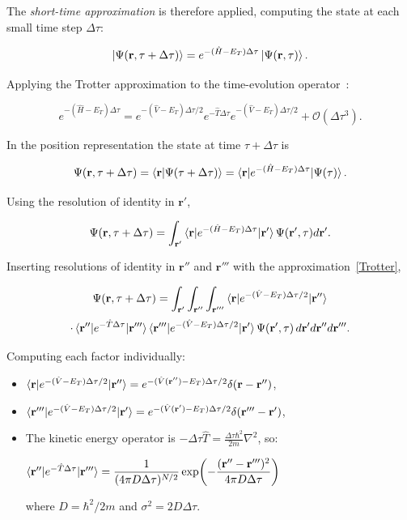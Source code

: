 \documentclass[11pt,a4paper,twoside,pdf]{article}
\numberwithin{equation}{section}
\begin{document}
The \textit{short-time approximation} is therefore applied, computing the state at
each small time step $\Delta \tau$:

$$
    \ket{\Psi(\mathbf{r}, \tau + \Delta \tau)} = e^{-(\hat{H}-E_T)\Delta \tau} \ket{\Psi(\mathbf{r}, \tau)}.
$$

Applying the Trotter approximation to the time-evolution operator~\cite{kalos2008monte}:

\begin{equation}
    e^{-(\hat{H}-E_T)\Delta \tau} = e^{-(\hat{V}-E_T)\Delta \tau/2}e^{-\hat{T}\Delta \tau}e^{-(\hat{V}-E_T)\Delta \tau /2} + \mathcal{O} (\Delta \tau^3).
\label{Trotter}
\end{equation}

In the position representation the state at time $\tau + \Delta \tau$ is

$$
    \Psi(\mathbf{r}, \tau + \Delta \tau) = \braket{\mathbf{r}|\Psi(\tau + \Delta \tau)} =  \braket{\mathbf{r}| e^{-(\hat{H}-E_T)\Delta \tau} | \Psi( \tau)}.
$$

Using the resolution of identity in $\mathbf{r'}$,

$$
    \Psi(\mathbf{r}, \tau + \Delta \tau) =\int_{\mathbf{r'}} \braket{\mathbf{r}| e^{-(\hat{H}-E_T)\Delta \tau} | \mathbf{r'}} \Psi(\mathbf{r'}, \tau ) d\mathbf{r'}.
$$

Inserting resolutions of identity in $\mathbf{r''}$ and $\mathbf{r'''}$
with the approximation~\ref{Trotter},

$$
    \Psi(\mathbf{r}, \tau + \Delta \tau) =
    \int_{\mathbf{r'}} \int_{\mathbf{r''}} \int_{\mathbf{r'''}}
    \braket{\mathbf{r}| e^{-(\hat{V}-E_T)\Delta \tau/2} | \mathbf{r''}}
$$
$$
    \cdot \braket{\mathbf{r''}| e^{-\hat{T}\Delta \tau} | \mathbf{r'''}}
    \braket{\mathbf{r'''}|e^{-(\hat{V}-E_T)\Delta \tau/2} | \mathbf{r'}}
    \Psi(\mathbf{r'}, \tau )
    \,d\mathbf{r'} d\mathbf{r''} d\mathbf{r'''}.
$$

Computing each factor individually:

\begin{itemize}
    \item $\braket{\mathbf{r}| e^{-(\hat{V}-E_T)\Delta \tau/2} | \mathbf{r''}} = e^{-(\hat{V}(\mathbf{r''})-E_T)\Delta\tau/2} \delta(\mathbf{r-r''})$,
    \item $\braket{\mathbf{r'''}|e^{-(\hat{V}-E_T)\Delta \tau/2} | \mathbf{r'}} = e^{-(\hat{V}(\mathbf{r'})-E_T)\Delta\tau/2} \delta(\mathbf{r'''-r'})$,
    \item The kinetic energy operator is $-\Delta \tau \hat{T} = \frac{\Delta \tau \hbar^2}{2m} \nabla^2$, so:

    $\braket{\mathbf{r''}| e^{-\hat{T}\Delta \tau} | \mathbf{r'''}} = \dfrac{1}{(4\pi D \Delta \tau)^{N/2}} \exp\!\left(-\dfrac{(\mathbf{r''} - \mathbf{r'''})^2}{4\pi D \Delta \tau}\right)$

    where $D=\hbar^2/2m$ and $\sigma^2 = 2D\Delta \tau$.
\end{itemize}
\end{document}
